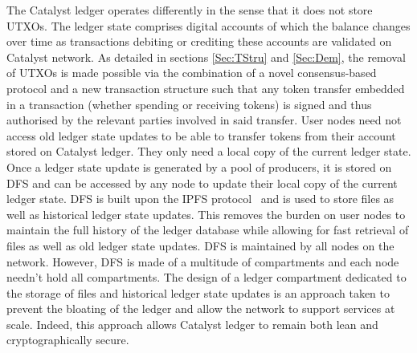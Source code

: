 The Catalyst ledger operates differently in the sense that it does not store UTXOs. The ledger state comprises digital accounts of which the balance changes over time as transactions debiting or crediting these accounts are validated on Catalyst network. As detailed in sections \ref{Sec:TStru} and \ref{Sec:Dem}, the removal of UTXOs is made possible via the combination of a novel consensus-based protocol and a new transaction structure such that any token transfer embedded in a transaction (whether spending or receiving tokens) is signed and thus authorised by the relevant parties involved in said transfer. User nodes need not access old ledger state updates to be able to transfer tokens from their account stored on Catalyst ledger. They only need a local copy of the current ledger state.\\

Once a ledger state update is generated by a pool of producers, it is stored on DFS and can be accessed by any node to update their local copy of the current ledger state. DFS is built upon the IPFS protocol~\cite{ipfs} and is used to store files as well as historical ledger state updates. This removes the burden on user nodes to maintain the full history of the ledger database while allowing for fast retrieval of files as well as old ledger state updates. DFS is maintained by all nodes on the network. However, DFS is made of a multitude of compartments and each node needn’t hold all compartments. The design of a ledger compartment dedicated to the storage of files and historical ledger state updates is an approach taken to prevent the bloating of the ledger and allow the network to support services at scale. Indeed, this approach allows Catalyst ledger to remain both lean and cryptographically secure.
